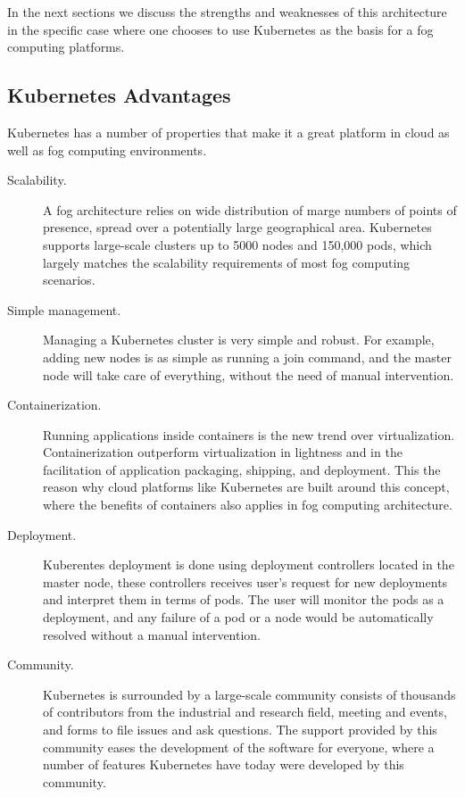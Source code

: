 \documentclass[letterpaper,twocolumn,10pt]{article}
\begin{document}
\medskip In the next sections we discuss the strengths and weaknesses
of this architecture in the specific case where one chooses to use
Kubernetes as the basis for a fog computing platforms.


\subsection{Kubernetes Advantages}

Kubernetes has a number of properties that make it a great platform in
cloud as well as fog computing environments.


\begin{description}
\item[Scalability.] A fog architecture relies on wide distribution of
  marge numbers of points of presence, spread over a potentially large
  geographical area. Kubernetes supports large-scale clusters up to
  5000 nodes and 150,000 pods, which largely matches the scalability
  requirements of most fog computing scenarios.

\item[Simple management.] Managing a Kubernetes cluster is very simple
  and robust. For example, adding new nodes is as simple as running a
  join command, and the master node will take care of everything,
  without the need of manual intervention.

\item[Containerization.] Running applications inside containers is the
  new trend over virtualization. Containerization outperform
  virtualization in lightness and in the facilitation of application
  packaging, shipping, and deployment. This the reason why cloud
  platforms like Kubernetes are built around this concept, where the
  benefits of containers also applies in fog computing architecture.

\item[Deployment.] Kuberentes deployment is done using deployment
  controllers located in the master node, these controllers receives
  user's request for new deployments and interpret them in terms of
  pods. The user will monitor the pods as a deployment, and any
  failure of a pod or a node would be automatically resolved without a
  manual intervention.

\item[Community.] Kubernetes is surrounded by a large-scale community
  consists of thousands of contributors from the industrial and
  research field, meeting and events, and forms to file issues and ask
  questions.  The support provided by this community eases the
  development of the software for everyone, where a number of features
  Kubernetes have today were developed by this community.
\end{description}
\end{document}
